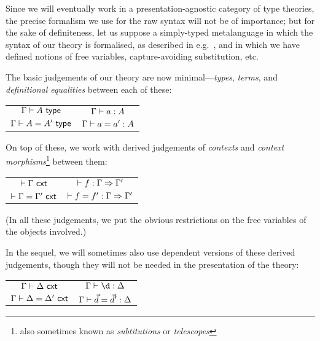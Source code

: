 \begin{para}
Since we will eventually work in a presentation-agnostic category of type theories, the precise formalism we use for the raw syntax will not be of importance; but for the sake of definiteness, let us suppose a simply-typed metalanguage in which the syntax of our theory is formalised, as described in e.g.\ \cite[6.1]{pitts:categorial-logic}, and in which we have defined notions of free variables, capture-avoiding substitution, etc.

The basic judgements of our theory are now minimal---\emph{types}, \emph{terms}, and \emph{definitional equalities} between each of these:
\end{para}
\begin{center}\begin{tabular}{@{\ }c@{\hskip 0.75in}c@{\ }}
$\Gamma \vdash A \ \mathsf{type} $ & $ \Gamma \vdash a:A $ \\ \rule{0pt}{3ex} 
$\Gamma \vdash A = A' \ \mathsf{type} $& $ \Gamma \vdash a = a' : A $ \\
\end{tabular}
\end{center}

On top of these, we work with derived judgements of \emph{contexts} and \emph{context morphisms}\footnote{also sometimes known as \emph{subtitutions} or \emph{telescopes}} between them:
\begin{center}\begin{tabular}{@{\ }c@{\hskip 0.75in}c@{\ }}
$\vdash \Gamma \ \mathsf{cxt}$ & $ \vdash  f : \Gamma \Rightarrow \Gamma' $  \\ \rule{0pt}{3ex} 
$\vdash \Gamma = \Gamma' \ \mathsf{cxt}$ &  $\vdash { f} = { f}' : \Gamma \Rightarrow \Gamma'$ \\
\end{tabular}
\end{center}

(In all these judgements, we put the obvious restrictions on the free variables of the objects involved.)

In the sequel, we will sometimes also use dependent versions of these derived judgements, though they will not be needed in the presentation of the theory:
\begin{center}\begin{tabular}{@{\ }c@{\hskip 0.75in}c@{\ }}
$ \Gamma \vdash \Delta \ \mathsf{cxt}$ & $\Gamma \types \d : \Delta $  \\ \rule{0pt}{3ex} 
$ \Gamma \vdash \Delta = \Delta' \ \mathsf{cxt}$ & $\Gamma \vdash \vec d = \vec d' : \Delta$ \\
\end{tabular}
\end{center}

